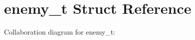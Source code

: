 \hypertarget{structenemy__t}{}\section{enemy\+\_\+t Struct Reference}
\label{structenemy__t}


Collaboration diagram for enemy\+\_\+t\+:
